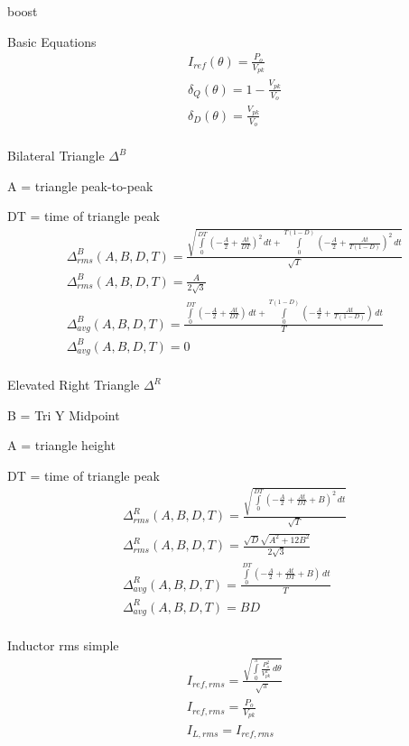 \documentclass[12pt]{report}
\begin{document}
boost


Basic Equations
\begin{align}
I_{ref}(\theta) = \frac{P_{o}}{V_{pk}}\\
\delta_{Q}(\theta) = 1 - \frac{V_{pk}}{V_{o}}\\
\delta_{D}(\theta) = \frac{V_{pk}}{V_{o}}\\
\end{align}

Bilateral Triangle $\Delta^B$ 

A = triangle peak-to-peak 

DT = time of triangle peak
\begin{align}
\Delta^B_{rms}(A,B,D,T) = \frac{\sqrt{\int\limits_{0}^{D T} \left(- \frac{A}{2} + \frac{A t}{D T}\right)^{2}\, dt + \int\limits_{0}^{T \left(1 - D\right)} \left(- \frac{A}{2} + \frac{A t}{T \left(1 - D\right)}\right)^{2}\, dt}}{\sqrt{T}}\\
\Delta^B_{rms}(A,B,D,T) = \frac{A}{2 \sqrt{3}}\\
\Delta^B_{avg}(A,B,D,T) = \frac{\int\limits_{0}^{D T} \left(- \frac{A}{2} + \frac{A t}{D T}\right)\, dt + \int\limits_{0}^{T \left(1 - D\right)} \left(- \frac{A}{2} + \frac{A t}{T \left(1 - D\right)}\right)\, dt}{T}\\
\Delta^B_{avg}(A,B,D,T) = 0\\
\end{align}

Elevated Right Triangle $\Delta^R$ 

B = Tri Y Midpoint 

A = triangle height 

DT = time of triangle peak
\begin{align}
\Delta^R_{rms}(A,B,D,T) = \frac{\sqrt{\int\limits_{0}^{D T} \left(- \frac{A}{2} + \frac{A t}{D T} + B\right)^{2}\, dt}}{\sqrt{T}}\\
\Delta^R_{rms}(A,B,D,T) = \frac{\sqrt{D} \sqrt{A^{2} + 12 B^{2}}}{2 \sqrt{3}}\\
\Delta^R_{avg}(A,B,D,T) = \frac{\int\limits_{0}^{D T} \left(- \frac{A}{2} + \frac{A t}{D T} + B\right)\, dt}{T}\\
\Delta^R_{avg}(A,B,D,T) = B D\\
\end{align}

Inductor rms simple
\begin{align}
I_{ref,rms} = \frac{\sqrt{\int\limits_{0}^{\pi} \frac{P_{o}^{2}}{V_{pk}^{2}}\, d\theta}}{\sqrt{\pi}}\\
I_{ref,rms} = \frac{P_{o}}{V_{pk}}\\
I_{L,rms} = I_{ref,rms}\\
\end{align}
\end{document}
